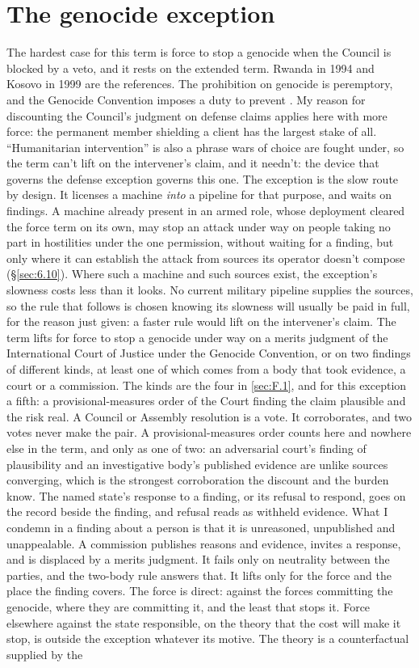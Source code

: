 \section{The genocide exception}
\label{sec:F.4}
The hardest case for this term is force to stop a genocide when the Council is blocked by a veto, and it rests on the extended term. Rwanda in 1994 and Kosovo in 1999 are the references. The prohibition on genocide is peremptory, and the Genocide Convention imposes a duty to prevent \autocite{icj2007bosnia}. My reason for discounting the Council's judgment on defense claims applies here with more force: the permanent member shielding a client has the largest stake of all. “Humanitarian intervention” is also a phrase wars of choice are fought under, so the term can't lift on the intervener's claim, and it needn't: the device that governs the defense exception governs this one. The exception is the slow route by design. It licenses a machine \emph{into} a pipeline for that purpose, and waits on findings. A machine already present in an armed role, whose deployment cleared the force term on its own, may stop an attack under way on people taking no part in hostilities under the one permission, without waiting for a finding, but only where it can establish the attack from sources its operator doesn't compose (\S\ref{sec:6.10}). Where such a machine and such sources exist, the exception's slowness costs less than it looks. No current military pipeline supplies the sources, so the rule that follows is chosen knowing its slowness will usually be paid in full, for the reason just given: a faster rule would lift on the intervener's claim. The term lifts for force to stop a genocide under way on a merits judgment of the International Court of Justice under the Genocide Convention, or on two findings of different kinds, at least one of which comes from a body that took evidence, a court or a commission. The kinds are the four in \ref{sec:F.1}, and for this exception a fifth: a provisional-measures order of the Court finding the claim plausible and the risk real. A Council or Assembly resolution is a vote. It corroborates, and two votes never make the pair. A provisional-measures order counts here and nowhere else in the term, and only as one of two: an adversarial court's finding of plausibility and an investigative body's published evidence are unlike sources converging, which is the strongest corroboration the discount and the burden know. The named state's response to a finding, or its refusal to respond, goes on the record beside the finding, and refusal reads as withheld evidence. What I condemn in a finding about a person is that it is unreasoned, unpublished and unappealable. A commission publishes reasons and evidence, invites a response, and is displaced by a merits judgment. It fails only on neutrality between the parties, and the two-body rule answers that. It lifts only for the force and the place the finding covers. The force is direct: against the forces committing the genocide, where they are committing it, and the least that stops it. Force elsewhere against the state responsible, on the theory that the cost will make it stop, is outside the exception whatever its motive. The theory is a counterfactual supplied by the 